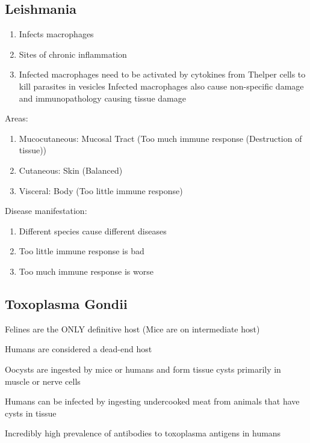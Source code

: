 \documentclass{notes}
\begin{document}
\subsection*{Leishmania}
\begin{enumerate}
    \item Infects macrophages
    \item Sites of chronic inflammation
    \item Infected macrophages need to be activated by cytokines from Thelper cells to kill parasites in vesicles
    \subitem Infected macrophages also cause non-specific damage and immunopathology causing tissue damage
\end{enumerate}

Areas:
\begin{enumerate}
    \item Mucocutaneous: Mucosal Tract (Too much immune response (Destruction of tissue))
    \item Cutaneous: Skin (Balanced)
    \item Visceral: Body (Too little immune response)
\end{enumerate}

Disease manifestation:
\begin{enumerate}
    \item Different species cause different diseases
    \item Too little immune response is bad
    \item Too much immune response is worse
\end{enumerate}

\subsection*{Toxoplasma Gondii}
Felines are the ONLY definitive host (Mice are on intermediate host)

Humans are considered a dead-end host

Oocysts are ingested by mice or humans and form tissue cysts primarily in muscle or nerve cells

Humans can be infected by ingesting undercooked meat from animals that have cysts in tissue

Incredibly high prevalence of antibodies to toxoplasma antigens in humans
\end{document}
